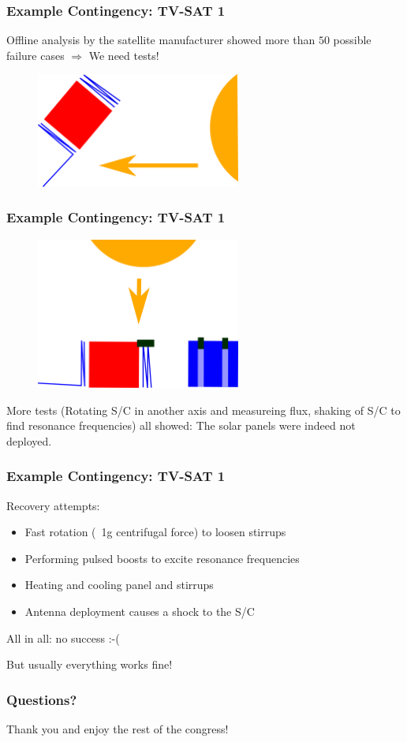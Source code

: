 \documentclass[12pt,utf8,notheorems,compress]{beamer}
\begin{document}
\begin{frame}
  \frametitle{Example Contingency: TV-SAT 1}
  \pause
  \vfill
  Offline analysis by the satellite manufacturer showed more than $50$ possible failure cases $\Longrightarrow$ We need tests! \pause
  \vfill
  \begin{figure}[!ht]
    \centering
    \includegraphics[width=0.6\textwidth]{tvsat1.png}
  \end{figure}
\end{frame}

\begin{frame}
  \frametitle{Example Contingency: TV-SAT 1}
  \begin{figure}[!ht]
    \centering
    \includegraphics[width=0.6\textwidth]{tvsat2.png}
  \end{figure}
  \pause
  More tests (Rotating S/C in another axis and measureing flux, shaking of S/C to find resonance frequencies) all showed: \pause
  The solar panels were indeed not deployed.
\end{frame}

\begin{frame}
  \frametitle{Example Contingency: TV-SAT 1}
  Recovery attempts: \pause
  \begin{itemize}
  \item Fast rotation (~1g centrifugal force) to loosen stirrups \pause
  \item Performing pulsed boosts to excite resonance frequencies \pause
  \item Heating and cooling panel and stirrups \pause
  \item Antenna deployment causes a shock to the S/C  \pause
  \end{itemize}
  \vfill
  All in all: no success :-( \pause
  
  But usually everything works fine!
\end{frame}

\begin{frame}
  \frametitle{Questions?}
  \vfill
  \begin{center}
    \Large Thank you and enjoy the rest of the congress!
  \end{center}
  \vfill
\end{frame}
\end{document}
